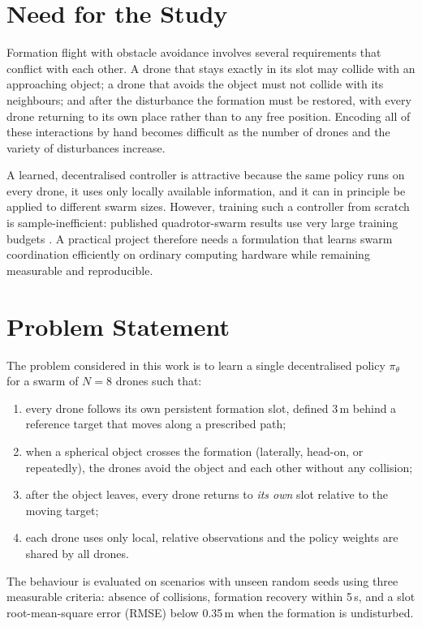 \section{Need for the Study}
Formation flight with obstacle avoidance involves several requirements that conflict with each other. A drone
that stays exactly in its slot may collide with an approaching object; a drone that avoids the object must
not collide with its neighbours; and after the disturbance the formation must be restored, with every drone
returning to its own place rather than to any free position. Encoding all of these interactions by hand
becomes difficult as the number of drones and the variety of disturbances increase.

A learned, decentralised controller is attractive because the same policy runs on every drone, it uses only
locally available information, and it can in principle be applied to different swarm sizes. However, training
such a controller from scratch is sample-inefficient: published quadrotor-swarm results use very large
training budgets \cite{batra2021decentralized}. A practical project therefore needs a formulation that learns
swarm coordination efficiently on ordinary computing hardware while remaining measurable and reproducible.

\section{Problem Statement}
\label{sec:problem}
The problem considered in this work is to learn a single decentralised policy $\pi_\theta$ for a swarm of
$N=8$ drones such that:
\begin{enumerate}
  \item every drone follows its own persistent formation slot, defined 3\,m behind a reference target that
        moves along a prescribed path;
  \item when a spherical object crosses the formation (laterally, head-on, or repeatedly), the drones avoid
        the object and each other without any collision;
  \item after the object leaves, every drone returns to \emph{its own} slot relative to the moving target;
  \item each drone uses only local, relative observations and the policy weights are shared by all drones.
\end{enumerate}
The behaviour is evaluated on scenarios with unseen random seeds using three measurable criteria: absence of
collisions, formation recovery within 5\,s, and a slot root-mean-square error (RMSE) below 0.35\,m when the
formation is undisturbed.

